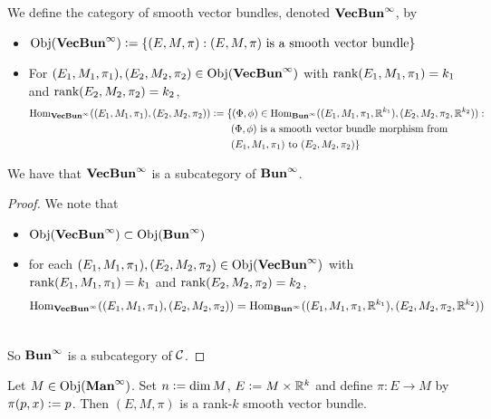 \documentclass{book}
\begin{document}
\begin{defn} 
	We define the category of smooth vector bundles, denoted $\bVecBuninf$, by 
	\begin{itemize}
		\item $\Obj(\bVecBuninf) \defeq \{(E, M, \pi): (E, M, \pi) \text{ is a smooth vector bundle}\}$
		\item For $(E_1, M_1, \pi_1), (E_2, M_2, \pi_2) \in \Obj(\bVecBuninf)$ with $\rnk (E_1, M_1, \pi_1) = k_1$ and $\rnk (E_2, M_2, \pi_2) = k_2$,  
		\begin{align*}
			\Hom_{\bVecBuninf}((E_1, M_1, \pi_1), (E_2, M_2, \pi_2)) 
			& \defeq \{ (\Phi, \phi) \in \Hom_{\bBuninf}((E_1, M_1, \pi_1, \R^{k_1}), (E_2, M_2, \pi_2, \R^{k_2})): \\
			& \quad \quad \text{$(\Phi, \phi)$ is a smooth vector bundle morphism from} \\
			& \quad \quad \text{$(E_1, M_1, \pi_1)$ to $(E_2, M_2, \pi_2)$} \}
		\end{align*}
	\end{itemize}
\end{defn}

\begin{ex} 
	We have that $\bVecBuninf$ is a subcategory of $\bBuninf$.
\end{ex}

\begin{proof} We note that 
	\begin{itemize}
		\item $\Obj(\bVecBuninf) \subset \Obj(\bBuninf)$
		\item for each $(E_1, M_1, \pi_1), (E_2, M_2, \pi_2) \in \Obj(\bVecBuninf)$ with $\rnk (E_1, M_1, \pi_1) = k_1$ and $\rnk (E_2, M_2, \pi_2) = k_2$, 
		$$\Hom_{\bVecBuninf}((E_1, M_1, \pi_1), (E_2, M_2, \pi_2)) = \Hom_{\bBuninf}((E_1, M_1, \pi_1, \R^{k_1}), (E_2, M_2, \pi_2, \R^{k_2}))$$
	\end{itemize}
\\
	So $\bBuninf$ is a subcategory of $\MC$.
\end{proof}

\begin{ex} 
Let $M \in \Obj(\bManinf)$. Set $n \defeq \dim M$, $E \defeq M \times \R^k$ and define $\pi: E \rightarrow M$ by $\pi(p, x) \defeq p $. Then $(E, M, \pi)$ is a rank-$k$ smooth vector bundle.
\end{ex}
\end{document}
